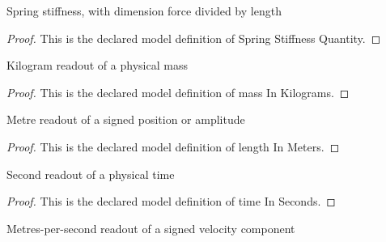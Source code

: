 \begin{definition}
  \label{def:physics:phyx-mini-0275:phyxminiproblems-problemphyxmini0275-springstiffnessquantity}
  Spring stiffness, with dimension force divided by length
\end{definition}
\begin{proof}
  This is the declared model definition of Spring Stiffness Quantity.
\end{proof}
\begin{definition}
  \label{def:physics:phyx-mini-0275:phyxminiproblems-problemphyxmini0275-massinkilograms}
  Kilogram readout of a physical mass
\end{definition}
\begin{proof}
  This is the declared model definition of mass In Kilograms.
\end{proof}
\begin{definition}
  \label{def:physics:phyx-mini-0275:phyxminiproblems-problemphyxmini0275-lengthinmeters}
  Metre readout of a signed position or amplitude
\end{definition}
\begin{proof}
  This is the declared model definition of length In Meters.
\end{proof}
\begin{definition}
  \label{def:physics:phyx-mini-0275:phyxminiproblems-problemphyxmini0275-timeinseconds}
  Second readout of a physical time
\end{definition}
\begin{proof}
  This is the declared model definition of time In Seconds.
\end{proof}
\begin{definition}
  \label{def:physics:phyx-mini-0275:phyxminiproblems-problemphyxmini0275-velocityinmeterspersecond}
  Metres-per-second readout of a signed velocity component
\end{definition}
